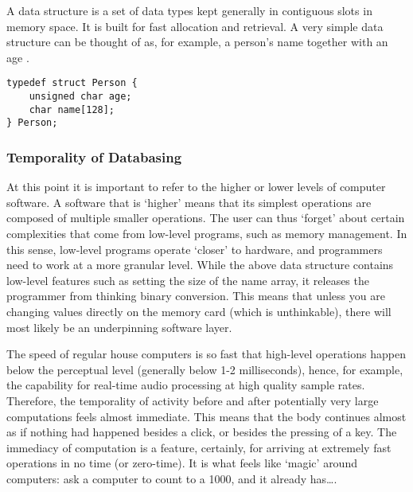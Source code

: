 A data structure is a set of data types kept generally in contiguous slots in memory space. It is built for fast allocation and retrieval. A very simple data structure can be thought of as, for example, a person's name together with an age .

\begin{flushleft}
\small
\begin{lstlisting}[caption={An example of a data structure in the programming language C. It is named \texttt{Person}, and it holds two variables: \texttt{age} and \texttt{name}, respectively a positive integer and a string of up to 128 characters.},captionpos=b,label={lst:person}]
typedef struct Person {
	unsigned char age;
	char name[128];
} Person;
\end{lstlisting}
\end{flushleft}

\subsubsection{Temporality of Databasing}

At this point it is important to refer to the higher or lower levels of computer software. A software that is `higher' means that its simplest operations are composed of multiple smaller operations. The user can thus `forget' about certain complexities that come from low-level programs, such as memory management. In this sense, low-level programs operate `closer' to hardware, and programmers need to work at a more granular level. While the above data structure contains low-level features such as setting the size of the name array, it releases the programmer from thinking binary conversion. This means that unless you are changing values directly on the memory card (which is unthinkable), there will most likely be an underpinning software layer. 

The speed of regular house computers is so fast that high-level operations happen below the perceptual level (generally below 1-2 milliseconds), hence, for example, the capability for real-time audio processing at high quality sample rates. Therefore, the temporality of activity before and after potentially very large computations feels almost immediate. This means that the body continues almost as if nothing had happened besides a click, or besides the pressing of a key. The immediacy of computation is a feature, certainly, for arriving at extremely fast operations in no time (or zero-time). It is what feels like `magic' around computers: ask a computer to count to a 1000, and it already has\dots. 


